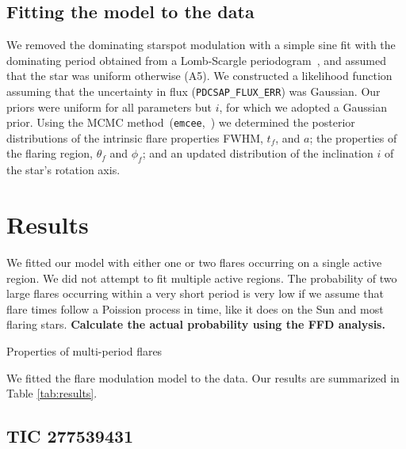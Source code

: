 \documentclass[fleqn,usenatbib,letters]{mnras}%
\newcommand{\FA}{TIC 277539431} %
\begin{document}
\subsection{Fitting the model to the data}
\label{ssec:fittingmodeltodata}
We removed the dominating starspot modulation with a simple sine fit with the dominating period obtained from a Lomb-Scargle periodogram~\citep{lomb1976, scargle1982}, and assumed that the star was uniform otherwise (A5).%
We constructed a likelihood function assuming that the uncertainty in flux (\texttt{PDCSAP\_FLUX\_ERR}) was Gaussian. Our priors were uniform for all parameters but $i$, for which we adopted a Gaussian prior. Using the MCMC method~(\texttt{emcee},~\citealt{foreman_mackey2013}) we determined the posterior distributions of the intrinsic flare properties FWHM, $t_f$, and $a$; the properties of the flaring region, $\theta_f$ and $\phi_f$; and an updated distribution of the inclination $i$ of the star's rotation axis.
\section{Results}
We fitted our model with either one or two flares occurring on a single active region. We did not attempt to fit multiple active regions. The probability of two large flares occurring within a very short period is very low if we assume that flare times follow a Poission process in time, like it does on the Sun and most flaring stars. \textbf{Calculate the actual probability using the FFD analysis.}
\label{sec:results}
\begin{table}
\centering
\caption{Properties of multi-period flares}
\label{tab:stars}


\end{table}
We fitted the flare modulation model to the data. Our results are summarized in Table \ref{tab:results}.
\subsection{\FA}
\end{document}
